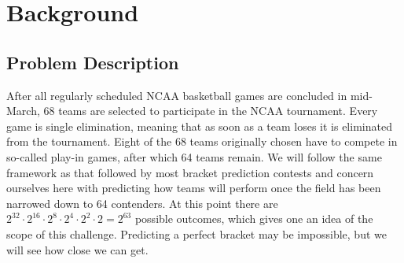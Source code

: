 \documentclass[10pt,a4paper, hidelinks]{article} %
\begin{document}
\pagestyle{plain} 
\title{\color{harvard}\rmfamily\normalfont{}}
\author{}
\date{} %

\maketitle

\mbox{}
\vfill

\begin{center}
	\large \color{harvard} 
\end{center}

\newpage

\hfill
\vspace{1cm}\hfill

\begin{abstract}
	Every year, millions of people fill out March Madness brackets in attempt to predict the outcome of the NCAA men's basketball tournament. A big part of the draw is that the tournament is notoriously difficult to predict, and predicting a perfect bracket is so improbable that Warren Buffet, a US investor, annually offers \$1MM a year for life to any of his employees who can predict the exact outcome of the tournament. Many algorithms for predicting the tournament attempt to predict results at the individual game level, based on how teams match up with one another. We will instead focus on predicting how many rounds a team will progress in the tournament based on its performance over the course of the preceding season, with the goal of building stable and consistent predictions of tournament outcomes.
\end{abstract}
\tableofcontents
\newpage

\section{Background}
\subsection{Problem Description}
After all regularly scheduled NCAA basketball games are concluded in mid-March, 68 teams are selected to participate in the NCAA tournament. Every game is single elimination, meaning that as soon as a team loses it is eliminated from the tournament. Eight of the 68 teams originally chosen have to compete in so-called play-in games, after which 64 teams remain. We will follow the same framework as that followed by most bracket prediction contests and concern ourselves here with predicting how teams will perform once the field has been narrowed down to 64 contenders. At this point there are $2^{32} \cdot 2^{16} \cdot 2^8 \cdot 2^4 \cdot 2^2 \cdot 2 = 2^{63}$ possible outcomes, which gives one an idea of the scope of this challenge. Predicting a perfect bracket may be impossible, but we will see how close we can get.
\end{document}
